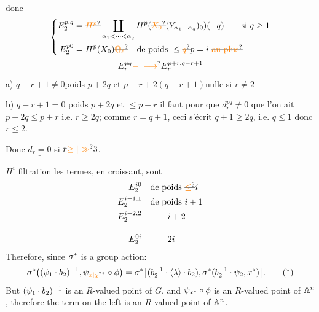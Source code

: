 donc 
\[
\left\{\begin{aligned}
E_2^{p,q}&=\deleted{\unsure{H^p}}\coprod_{\alpha_1<\cdots<\alpha_q}H^p(\deleted{\unsure{X_0}}(Y_{\alpha_1\cdots\alpha_q})_0)(-q)\qquad\text{si }q\geq1\\
E_2^{p0}&=H^p(X_0)\deleted{\unsure{\mathbb{Q}_\ell}}\quad\text{de poids }\leq\deleted{\unsure{q}}p=i\ \deleted{\text{\unsure{au plus}}}
\end{aligned}\right.
\]
\[
E_r^{pq}\unsure{-|\longrightarrow}E_r^{p+r,q-r+1}
\]
a) $q-r+1\neq0$\quad poids $p+2q$ et $p+r+2(q-r+1)$\quad nulle si $r\neq2$

b) $q-r+1=0$  poids $p+2q$ et $\leq p+r$ il faut pour que $d_r^{pq}\neq0$ que l'on ait $p+2q\leq p+r$ i.e. $r\geq2q$; comme $r=q+1$, ceci s'écrit $q+1\geq2q$, i.e. $q\leq1$ donc $r\leq2$.

Donc $\underline{d_r=0}$ si $r\unsure{\geq|\gg}3$.


$H^i$ filtration  les termes, en croissant, sont
\[
\begin{aligned}
E_2^{i0}&\quad\text{de poids }\deleted{\unsure{\leq}}i\\
E_2^{i-1,1}&\quad\text{de poids }i+1\\
E_2^{i-2,2}&\quad\text{---}\quad i+2\\[1em]
E_2^{0i}&\quad\text{---}\quad2i
\end{aligned}
\]
Therefore, since $\sigma^*$ is a group action:
\[
\handwritten{\sigma}^*\handwritten{\bigl(}(\handwritten{\psi}_1\cdot b_2)^{-1},\handwritten{\psi_{{\unsure{x|\chi}}^*}\circ\phi}\handwritten{\bigr)}=\handwritten{\sigma}^*\handwritten{\bigl[}(b_2^{-1}\cdot\handwritten{\langle\lambda\rangle}\cdot b_2),\handwritten{\sigma}^*(b_2^{-1}\cdot\handwritten{\psi}_2,x^*)\handwritten{\bigr]}.
\tag*{(*)}
\]
But $(\psi_1\cdot b_2)^{-1}$ is an $R$-valued point of $G$, and $\psi_{x^*}\circ\phi$ is an $R$-valued point of $\mathbb{A}^n$, therefore the term on the left is an $R$-valued point of $\mathbb{A}^n$.

